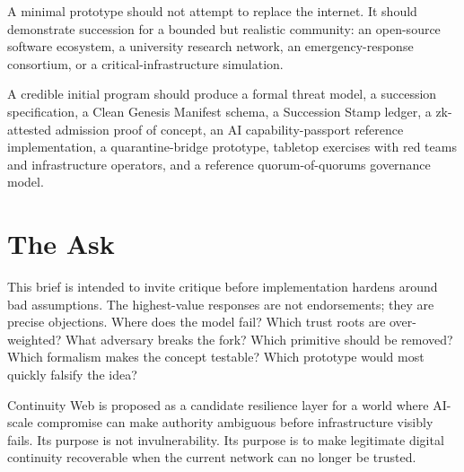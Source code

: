 \documentclass[10pt,letterpaper,twocolumn]{article}
\begin{document}
A minimal prototype should not attempt to replace the internet. It should demonstrate succession for a bounded but realistic community: an open-source software ecosystem, a university research network, an emergency-response consortium, or a critical-infrastructure simulation.

A credible initial program should produce a formal threat model, a succession specification, a Clean Genesis Manifest schema, a Succession Stamp ledger, a zk-attested admission proof of concept, an AI capability-passport reference implementation, a quarantine-bridge prototype, tabletop exercises with red teams and infrastructure operators, and a reference quorum-of-quorums governance model.

\section{The Ask}

This brief is intended to invite critique before implementation hardens around bad assumptions. The highest-value responses are not endorsements; they are precise objections. Where does the model fail? Which trust roots are over-weighted? What adversary breaks the fork? Which primitive should be removed? Which formalism makes the concept testable? Which prototype would most quickly falsify the idea?

Continuity Web is proposed as a candidate resilience layer for a world where AI-scale compromise can make authority ambiguous before infrastructure visibly fails. Its purpose is not invulnerability. Its purpose is to make legitimate digital continuity recoverable when the current network can no longer be trusted.
\end{document}
